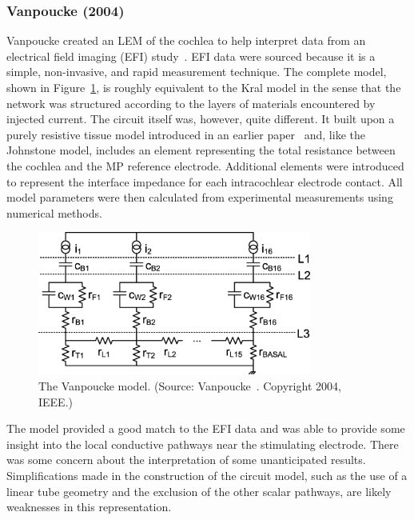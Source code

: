 \subsubsection{Vanpoucke \etal{} (2004)}

Vanpoucke \etal{} created an LEM of the cochlea to help interpret data from an
electrical field imaging (EFI) study~\cite{vanpoucke2004identification}. EFI
data were sourced because it is a simple, non-invasive, and rapid measurement
technique. The complete model, shown in Figure~\ref{fig:model_vanpoucke}, is
roughly equivalent to the Kral model in the sense that the network was
structured according to the layers of materials encountered by injected current.
The circuit itself was, however, quite different. It built upon a purely
resistive tissue model introduced in an earlier paper~\cite{vanpoucke2004facial}
and, like the Johnstone model, includes an element representing the total
resistance between the cochlea and the MP reference electrode. Additional
elements were introduced to represent the interface impedance for each
intracochlear electrode contact. All model parameters were then calculated from
experimental measurements using numerical methods.

\begin{figure}
	\centering
	\includegraphics[width=9cm]{Background/vanpoucke}
	\caption[The Vanpoucke model]{The Vanpoucke model. (Source:
	Vanpoucke~\cite{vanpoucke2004identification}. Copyright \textcopyright{} 2004,
	IEEE.)}
	\label{fig:model_vanpoucke}
\end{figure}

The model provided a good match to the EFI data and was able to provide some
insight into the local conductive pathways near the stimulating electrode. There
was some concern about the interpretation of some unanticipated results.
Simplifications made in the construction of the circuit model, such as the use
of a linear tube geometry and the exclusion of the other scalar pathways, are
likely weaknesses in this representation.


